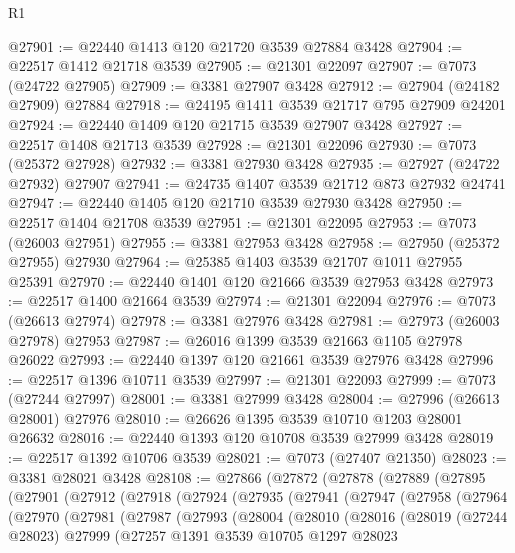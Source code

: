 \begin{lexlean}{R1}
\begin{coremodule}
@27901 := @22440 @1413 @120 @21720 @3539 @27884 @3428
@27904 := @22517 @1412 @21718 @3539
@27905 := @21301 @22097
@27907 := @7073 (@24722 @27905)
@27909 := @3381 @27907 @3428
@27912 := @27904 (@24182 @27909) @27884
@27918 := @24195 @1411 @3539 @21717 @795 @27909 @24201
@27924 := @22440 @1409 @120 @21715 @3539 @27907 @3428
@27927 := @22517 @1408 @21713 @3539
@27928 := @21301 @22096
@27930 := @7073 (@25372 @27928)
@27932 := @3381 @27930 @3428
@27935 := @27927 (@24722 @27932) @27907
@27941 := @24735 @1407 @3539 @21712 @873 @27932 @24741
@27947 := @22440 @1405 @120 @21710 @3539 @27930 @3428
@27950 := @22517 @1404 @21708 @3539
@27951 := @21301 @22095
@27953 := @7073 (@26003 @27951)
@27955 := @3381 @27953 @3428
@27958 := @27950 (@25372 @27955) @27930
@27964 := @25385 @1403 @3539 @21707 @1011 @27955 @25391
@27970 := @22440 @1401 @120 @21666 @3539 @27953 @3428
@27973 := @22517 @1400 @21664 @3539
@27974 := @21301 @22094
@27976 := @7073 (@26613 @27974)
@27978 := @3381 @27976 @3428
@27981 := @27973 (@26003 @27978) @27953
@27987 := @26016 @1399 @3539 @21663 @1105 @27978 @26022
@27993 := @22440 @1397 @120 @21661 @3539 @27976 @3428
@27996 := @22517 @1396 @10711 @3539
@27997 := @21301 @22093
@27999 := @7073 (@27244 @27997)
@28001 := @3381 @27999 @3428
@28004 := @27996 (@26613 @28001) @27976
@28010 := @26626 @1395 @3539 @10710 @1203 @28001 @26632
@28016 := @22440 @1393 @120 @10708 @3539 @27999 @3428
@28019 := @22517 @1392 @10706 @3539
@28021 := @7073 (@27407 @21350)
@28023 := @3381 @28021 @3428
@28108 := @27866
    (@27872
      (@27878
        (@27889
          (@27895
            (@27901
              (@27912
                (@27918
                  (@27924
                    (@27935
                      (@27941
                        (@27947
                          (@27958
                            (@27964
                              (@27970
                                (@27981
                                  (@27987
                                    (@27993
                                      (@28004
                                        (@28010
                                          (@28016
                                            (@28019
                                              (@27244 @28023)
                                              @27999
                                              (@27257
                                                @1391
                                                @3539
                                                @10705
                                                @1297
                                                @28023

\end{coremodule}
\end{lexlean}

